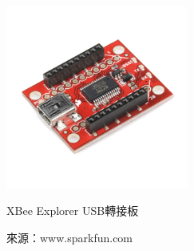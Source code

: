 \begin{figure}[h!]
	\centering
	\includegraphics[width=6cm]{figures/hardware/xbee2usb}
	\caption{XBee Explorer USB轉接板}
	\caption*{來源：www.sparkfun.com}
	\label{f:xbee2usb}
\end{figure}

